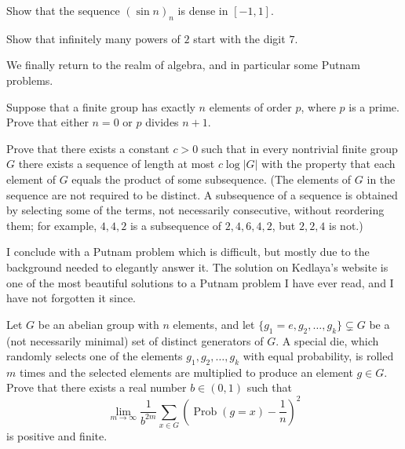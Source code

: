 \documentclass{article}
\begin{document}
\begin{exercise}
Show that the sequence $(\sin n)_n$ is dense in $[-1,1]$. 
\end{exercise}

\begin{exercise}
Show that infinitely many powers of $2$ start with the digit $7$.
\end{exercise}

We finally return to the realm of algebra, and in particular some Putnam problems.

\begin{exercise}[2007 A5]
Suppose that a finite group has exactly $n$ elements of order $p$, where $p$ is a prime. Prove that either $n = 0$ or $p$ divides $n + 1$.
\end{exercise}
\begin{exercise}[2008 A6]
Prove that there exists a constant $c > 0$ such that in every nontrivial finite group $G$ there exists a sequence of length at most $c \log |G|$ with the property that each element of $G$ equals the product of some subsequence. (The elements of $G$ in the sequence are not required to be distinct. A subsequence of a sequence is obtained by selecting some of the terms, not necessarily consecutive, without reordering them; for example, $4, 4, 2$ is a subsequence of $2,4,6,4,2$, but $2,2,4$ is not.)
\end{exercise}

I conclude with a Putnam problem which is difficult, but mostly due to the background needed to elegantly answer it. The solution on Kedlaya's website is one of the most beautiful solutions to a Putnam problem I have ever read, and I have not forgotten it since. 

\begin{exercise}[2011 A6]
Let $G$ be an abelian group with $n$ elements, and let $\{g_1 = e,g_2,\dots,g_k\} \subsetneq G$ be a (not necessarily minimal) set of distinct generators of $G$. A special die, which randomly selects one of the elements $g_1,g_2,\dots,g_k$ with equal probability, is rolled $m$ times and the selected elements are multiplied to produce an element $g\in G$. Prove that there exists a real number $b\in (0,1)$ such that 
\[\lim_{m\to\infty}\frac{1}{b^{2m}}\sum_{x\in G} 
\left(\operatorname{Prob}(g=x)-\frac{1}{n}\right)^2\] is positive and finite. 
\end{exercise}
\end{document}
